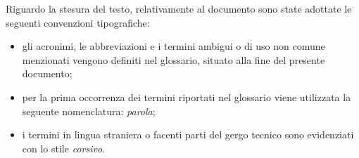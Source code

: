 Riguardo la stesura del testo, relativamente al documento sono state adottate le seguenti convenzioni tipografiche:
\begin{itemize}
	\item gli acronimi, le abbreviazioni e i termini ambigui o di uso non comune menzionati vengono definiti nel glossario, situato alla fine del presente documento;
	\item per la prima occorrenza dei termini riportati nel glossario viene utilizzata la seguente nomenclatura: \emph{parola}\glsfirstoccur;
	\item i termini in lingua straniera o facenti parti del gergo tecnico sono evidenziati con lo stile \emph{corsivo}.
\end{itemize}